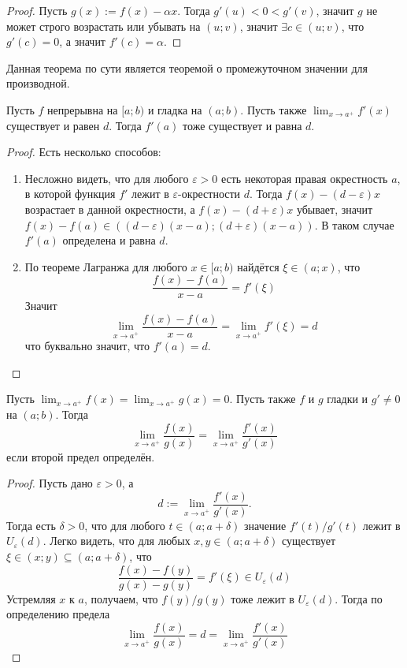 \documentclass[12pt,a4paper]{article}
\begin{document}
    \begin{proof}
        Пусть $g(x) := f(x) - \alpha x$. Тогда $g'(u) < 0 < g'(v)$, значит $g$ не может строго возрастать или убывать на $(u; v)$, значит $\exists c \in (u; v)$, что $g'(c) = 0$, а значит $f'(c)=\alpha$.
    \end{proof}

    \begin{remark}
        Данная теорема по сути является теоремой о промежуточном значении для производной.
    \end{remark}

    \begin{theorem}
        Пусть $f$ непрерывна на $[a; b)$ и гладка на $(a; b)$. Пусть также $\lim_{x \to a^+} f'(x)$ существует и равен $d$. Тогда $f'(a)$ тоже существует и равна $d$.
    \end{theorem}

    \begin{proof}
        Есть несколько способов:
        \begin{enumerate}
            \item Несложно видеть, что для любого $\varepsilon > 0$ есть некоторая правая окрестность $a$, в которой функция $f'$ лежит в $\varepsilon$-окрестности $d$. Тогда $f(x) - (d-\varepsilon)x$ возрастает в данной окрестности, а $f(x) - (d+\varepsilon)x$ убывает, значит $f(x) - f(a) \in ((d - \varepsilon)(x-a); (d + \varepsilon)(x-a))$. В таком случае $f'(a)$ определена и равна $d$.
            \item По теореме Лагранжа для любого $x \in [a; b)$ найдётся $\xi \in (a; x)$, что
                \[\frac{f(x) - f(a)}{x - a} = f'(\xi)\]
                Значит
                \[\lim_{x \to a^+} \frac{f(x) - f(a)}{x - a} = \lim_{x \to a^+} f'(\xi) = d\]
                что буквально значит, что $f'(a) = d$.
        \end{enumerate}
    \end{proof}

    \begin{theorem}
        Пусть $\lim_{x \to a^+} f(x) = \lim_{x \to a^+} g(x) = 0$. Пусть также $f$ и $g$ гладки и $g' \neq 0$ на $(a; b)$. Тогда
        \[\lim_{x \to a^+} \frac{f(x)}{g(x)} = \lim_{x \to a^+} \frac{f'(x)}{g'(x)}\]
        если второй предел определён.
    \end{theorem}

    \begin{proof}
        Пусть дано $\varepsilon > 0$, а
        \[d := \lim_{x \to a^+} \frac{f'(x)}{g'(x)}.\]
        Тогда есть $\delta > 0$, что для любого $t \in (a; a + \delta)$ значение $f'(t)/g'(t)$ лежит в $U_\varepsilon(d)$. Легко видеть, что для любых $x, y \in (a; a + \delta)$ существует $\xi \in (x; y) \subseteq (a; a + \delta)$, что
        \[\frac{f(x) - f(y)}{g(x) - g(y)} = f'(\xi) \in U_\varepsilon(d)\]
        Устремляя $x$ к $a$, получаем, что $f(y)/g(y)$ тоже лежит в $U_\varepsilon(d)$. Тогда по определению предела
        \[\lim_{x \to a^+} \frac{f(x)}{g(x)} = d = \lim_{x \to a^+} \frac{f'(x)}{g'(x)}\]
    \end{proof}
\end{document}
